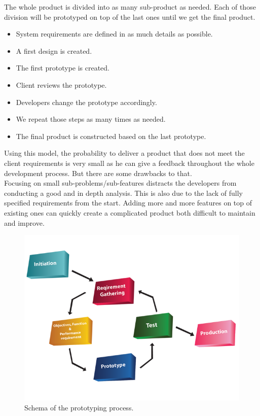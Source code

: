 \documentclass[12pt]{article}
\begin{document}
The whole product is divided into as many sub-product as needed. Each of those division will be prototyped on top of the last ones until we get the final product.\\

\begin{itemize}

\item System requirements are defined in as much details as possible.
\item A first design is created.
\item The first prototype is created.
\item Client reviews the prototype.
\item Developers change the prototype accordingly.
\item We repeat those steps as many times as needed.
\item The final product is constructed based on the last prototype.

\end{itemize}

Using this model, the probability to deliver a product that does not meet the client requirements is very small as he can give a feedback throughout the whole development process. But there are some drawbacks to that.\\

Focusing on small sub-problems/sub-features distracts the developers from conducting a good and in depth analysis. This is also due to the lack of fully specified requirements from the start. Adding more and more features on top of existing ones can quickly create a complicated product both difficult to maintain and improve.\\

\begin{figure}
    \centering
    \includegraphics[scale=0.4]{prototyping.png}
    \caption{Schema of the prototyping process.}
    \label{Prototyping}
\end{figure}
\end{document}

